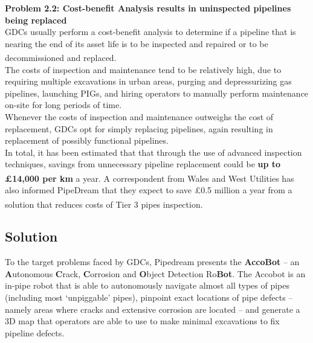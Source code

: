 \documentclass[11pt]{article}		%
\newcommand{\supercite}[1]{\textsuperscript{\cite{#1}}}		%
\begin{document}
    \textbf{Problem 2.2: Cost-benefit Analysis results in uninspected pipelines being replaced}\\
    GDCs usually perform a cost-benefit analysis to determine if a pipeline that is nearing the end of its asset life is to be inspected and repaired or to be decommissioned and replaced\supercite{sönnichsen_5_2021}. \\ \hspace*{3ex}
    The costs of inspection and maintenance tend to be relatively high, due to requiring multiple excavations in urban areas, purging and depressurizing gas pipelines, launching PIGs, and hiring operators to manually perform maintenance on-site for long periods of time. \\ \hspace*{3ex}
    Whenever the costs of inspection and maintenance outweighs the cost of replacement, GDCs opt for simply replacing pipelines, again resulting in replacement of possibly functional pipelines. \\ \hspace*{3ex}
    In total, it has been estimated that that through the use of advanced inspection techniques, savings from unnecessary pipeline replacement could be \textbf{up to £14,000 per km} a year\supercite{sönnichsen_5_2021}. A correspondent from Wales and West Utilities has also informed PipeDream that they expect to save £0.5 million a year from a solution that reduces costs of Tier 3 pipes inspection\supercite{sönnichsen_5_2021}. 

	\subsection[Solution]{Solution}
    To the target problems faced by GDCs, Pipedream presents the \textbf{AccoBot} – an \textbf{A}utonomous \textbf{C}rack, \textbf{C}orrosion and \textbf{O}bject Detection Ro\textbf{Bot}. 
    The Accobot is an in-pipe robot that is able to autonomously navigate almost all types of pipes (including most ‘unpiggable’ pipes), pinpoint exact locations of pipe defects – namely areas where cracks and extensive corrosion are located – and generate a 3D map that operators are able to use to make minimal excavations to fix pipeline defects. 
	
\end{document}
